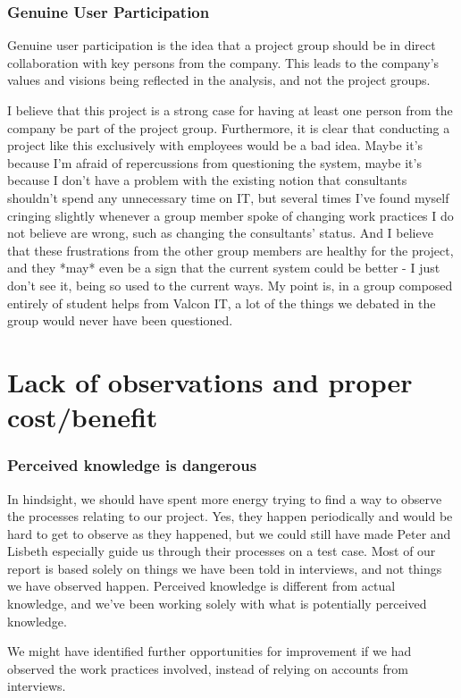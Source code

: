 \subsubsection{Genuine User Participation}
Genuine user participation is the idea that a project group should be in direct collaboration with key persons from the company. This leads to the company's values and visions being reflected in the analysis, and not the project groups.

I believe that this project is a strong case for having at least one person from the company be part of the project group. Furthermore, it is clear that conducting a project like this exclusively with employees would be a bad idea. Maybe it's because I'm afraid of repercussions from questioning the system, maybe it's because I don't have a problem with the existing notion that consultants shouldn't spend any unnecessary time on IT, but several times I've found myself cringing slightly whenever a group member spoke of changing work practices I do not believe are wrong, such as changing the consultants' status.
And I believe that these frustrations from the other group members are healthy for the project, and they *may* even be a sign that the current system could be better - I just don't see it, being so used to the current ways. My point is, in a group composed entirely of student helps from Valcon IT, a lot of the things we debated in the group would never have been questioned.


\section{Lack of observations and proper cost/benefit}
\subsubsection{Perceived knowledge is dangerous}
In hindsight, we should have spent more energy trying to find a way to observe the processes relating to our project. Yes, they happen periodically and would be hard to get to observe as they happened, but we could still have made Peter and Lisbeth especially guide us through their processes on a test case. Most of our report is based solely on things we have been told in interviews, and not things we have observed happen. Perceived knowledge is different from actual knowledge, and we've been working solely with what is potentially perceived knowledge.

We might have identified further opportunities for improvement if we had observed the work practices involved, instead of relying on accounts from interviews.

